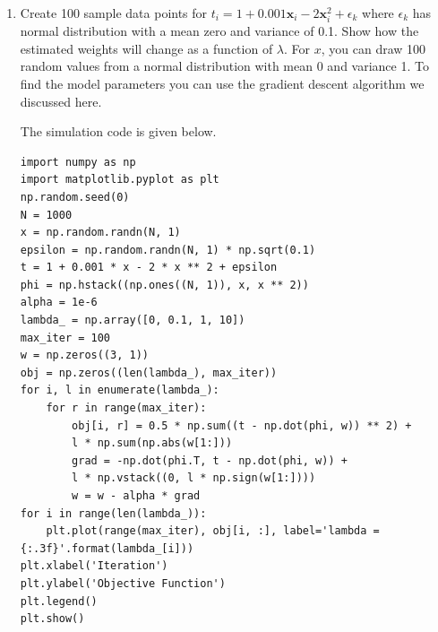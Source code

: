\documentclass{article}
\begin{document}
\begin{enumerate}
    \item Create 100 sample data points for $t_i = 1 + 0.001 \mathbf{x}_i - 2 \mathbf{x}_i^2 +\epsilon_k$ where $\epsilon_k$ has normal distribution 
    with a mean zero and variance of 0.1. Show how the estimated weights will change as a function of $\lambda$. For 
    $x$, you can draw  100 random values from a normal distribution with mean 0 and variance 1. To find the 
    model parameters you can use the gradient descent algorithm we discussed here. 
    \color{blue}
    \begin{sol}
    The simulation code is given below.
    \begin{lstlisting}
import numpy as np
import matplotlib.pyplot as plt
np.random.seed(0)
N = 1000
x = np.random.randn(N, 1)
epsilon = np.random.randn(N, 1) * np.sqrt(0.1)
t = 1 + 0.001 * x - 2 * x ** 2 + epsilon
phi = np.hstack((np.ones((N, 1)), x, x ** 2))
alpha = 1e-6
lambda_ = np.array([0, 0.1, 1, 10])
max_iter = 100
w = np.zeros((3, 1))
obj = np.zeros((len(lambda_), max_iter))
for i, l in enumerate(lambda_):
    for r in range(max_iter):
        obj[i, r] = 0.5 * np.sum((t - np.dot(phi, w)) ** 2) + 
        l * np.sum(np.abs(w[1:]))
        grad = -np.dot(phi.T, t - np.dot(phi, w)) + 
        l * np.vstack((0, l * np.sign(w[1:])))
        w = w - alpha * grad
for i in range(len(lambda_)):
    plt.plot(range(max_iter), obj[i, :], label='lambda = {:.3f}'.format(lambda_[i]))
plt.xlabel('Iteration')
plt.ylabel('Objective Function')
plt.legend()
plt.show()


\end{lstlisting}
\end{sol}
\end{enumerate}
\end{document}
